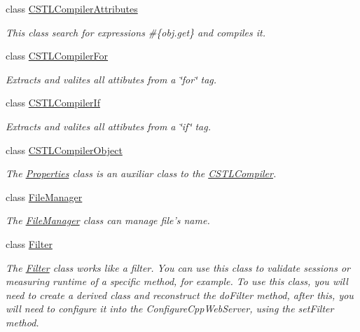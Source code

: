 \begin{DoxyCompactItemize}
class \hyperlink{class_c_w_f_1_1_c_s_t_l_compiler_attributes}{C\+S\+T\+L\+Compiler\+Attributes}
\begin{DoxyCompactList}\small\item\em This class search for expressions \#\{obj.\+get\} and compiles it. \end{DoxyCompactList}\item 
class \hyperlink{class_c_w_f_1_1_c_s_t_l_compiler_for}{C\+S\+T\+L\+Compiler\+For}
\begin{DoxyCompactList}\small\item\em Extracts and valites all attibutes from a \char`\"{}for\char`\"{} tag. \end{DoxyCompactList}\item 
class \hyperlink{class_c_w_f_1_1_c_s_t_l_compiler_if}{C\+S\+T\+L\+Compiler\+If}
\begin{DoxyCompactList}\small\item\em Extracts and valites all attibutes from a \char`\"{}if\char`\"{} tag. \end{DoxyCompactList}\item 
class \hyperlink{class_c_w_f_1_1_c_s_t_l_compiler_object}{C\+S\+T\+L\+Compiler\+Object}
\begin{DoxyCompactList}\small\item\em The \hyperlink{class_c_w_f_1_1_properties}{Properties} class is an auxiliar class to the \hyperlink{class_c_w_f_1_1_c_s_t_l_compiler}{C\+S\+T\+L\+Compiler}. \end{DoxyCompactList}\item 
class \hyperlink{class_c_w_f_1_1_file_manager}{File\+Manager}
\begin{DoxyCompactList}\small\item\em The \hyperlink{class_c_w_f_1_1_file_manager}{File\+Manager} class can manage file's name. \end{DoxyCompactList}\item 
class \hyperlink{class_c_w_f_1_1_filter}{Filter}
\begin{DoxyCompactList}\small\item\em The \hyperlink{class_c_w_f_1_1_filter}{Filter} class works like a filter. You can use this class to validate sessions or measuring runtime of a specific method, for example. To use this class, you will need to create a derived class and reconstruct the do\+Filter method, after this, you will need to configure it into the Configure\+Cpp\+Web\+Server, using the set\+Filter method. \end{DoxyCompactList}\item 

\end{DoxyCompactItemize}
